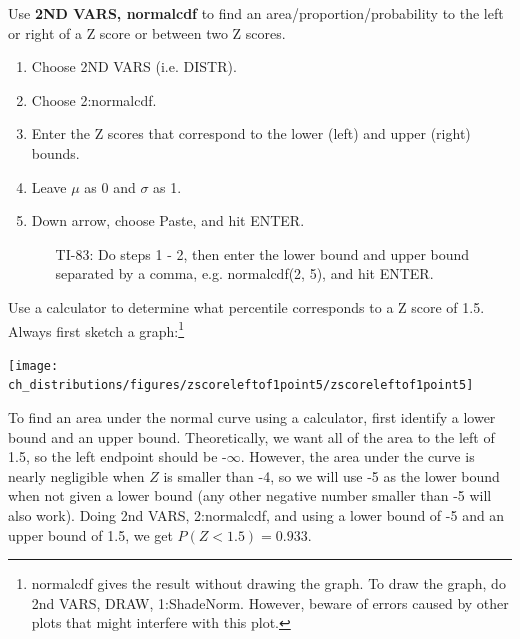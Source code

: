 \begin{termBox}{
Use \textbf{2ND VARS, normalcdf} to find an area/proportion/probability to the left or right of a Z score or between two Z scores.\vspace{-1mm}
\begin{enumerate}
\setlength{\itemsep}{0mm}
\item Choose 2ND VARS (i.e. DISTR).
\item Choose 2:normalcdf.
\item Enter the Z scores that correspond to the lower (left) and upper (right) bounds.
\item Leave $\mu$ as 0 and $\sigma$ as 1.
\item Down arrow, choose Paste, and hit ENTER.\vspace{-1.5mm}
\begin{itemize}
\item[TI-83: ] Do steps 1 - 2, then enter the lower bound and upper bound separated by a comma, e.g. normalcdf(2, 5), and hit ENTER.
\end{itemize}
\end{enumerate}
}
\end{termBox}

\begin{example}{Use a calculator to determine what percentile corresponds to a Z score of 1.5.}
Always first sketch a graph:\footnote{normalcdf gives the result without drawing the graph. To draw the graph, do 2nd VARS, DRAW, 1:ShadeNorm. However, beware of errors caused by other plots that might interfere with this plot.}
\begin{center}
\texttt{[image: ch\_distributions/figures/zscoreleftof1point5/zscoreleftof1point5]}\vspace{-2mm}
\end{center}
To find an area under the normal curve using a calculator, first identify a lower bound and an upper bound. Theoretically, we want all of the area to the left of 1.5, so the left endpoint should be -$\infty$. However, the area under the curve is nearly negligible when $Z$ is smaller than -4, so we will use -5 as the lower bound when not given a lower bound (any other negative number smaller than -5 will also work).  Doing 2nd VARS, 2:normalcdf, and using a lower bound of -5 and an upper bound of 1.5, we get $P(Z < 1.5) = 0.933$.
\end{example}

